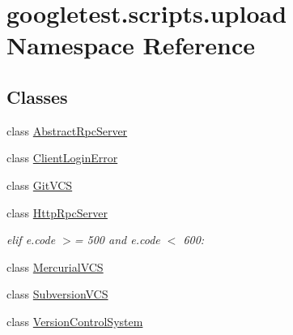 \hypertarget{namespacegoogletest_1_1scripts_1_1upload}{}\section{googletest.\+scripts.\+upload Namespace Reference}
\label{namespacegoogletest_1_1scripts_1_1upload}
\subsection*{Classes}
\begin{DoxyCompactItemize}
\item 
class \mbox{\hyperlink{classgoogletest_1_1scripts_1_1upload_1_1_abstract_rpc_server}{Abstract\+Rpc\+Server}}
\item 
class \mbox{\hyperlink{classgoogletest_1_1scripts_1_1upload_1_1_client_login_error}{Client\+Login\+Error}}
\item 
class \mbox{\hyperlink{classgoogletest_1_1scripts_1_1upload_1_1_git_v_c_s}{Git\+V\+CS}}
\item 
class \mbox{\hyperlink{classgoogletest_1_1scripts_1_1upload_1_1_http_rpc_server}{Http\+Rpc\+Server}}
\begin{DoxyCompactList}\small\item\em elif e.\+code $>$= 500 and e.\+code $<$ 600\+: \end{DoxyCompactList}\item 
class \mbox{\hyperlink{classgoogletest_1_1scripts_1_1upload_1_1_mercurial_v_c_s}{Mercurial\+V\+CS}}
\item 
class \mbox{\hyperlink{classgoogletest_1_1scripts_1_1upload_1_1_subversion_v_c_s}{Subversion\+V\+CS}}
\item 
class \mbox{\hyperlink{classgoogletest_1_1scripts_1_1upload_1_1_version_control_system}{Version\+Control\+System}}
\end{DoxyCompactItemize}
